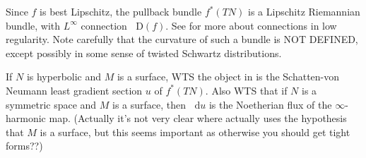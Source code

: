\documentclass[reqno,11pt]{amsart}
\newcommand*\dif{\mathop{}\!\mathrm{d}}
\newcommand*\Dif{\mathop{}\!\mathrm{D}}
\theoremstyle{definition}
\numberwithin{equation}{section}
\begin{document}
Since $f$ is best Lipschitz, the pullback bundle $f^*(TN)$ is a Lipschitz Riemannian bundle, with $L^\infty$ connection $\Dif(f)$.
See \cite{Oh_2018} for more about connections in low regularity.
Note carefully that the curvature of such a bundle is NOT DEFINED, except possibly in some sense of twisted Schwartz distributions.

If $N$ is hyperbolic and $M$ is a surface, WTS the object in \cite[Theorem 3.13]{daskalopoulos2022analytic} is the Schatten-von Neumann least gradient section $u$ of $f^*(TN)$.
Also WTS that if $N$ is a symmetric space and $M$ is a surface, then $\dif u$ is the Noetherian flux of the $\infty$-harmonic map.
(Actually it's not very clear where \cite{daskalopoulos2022analytic} actually uses the hypothesis that $M$ is a surface, but this seems important as otherwise you should get tight forms??)


\printbibliography
\end{document}
